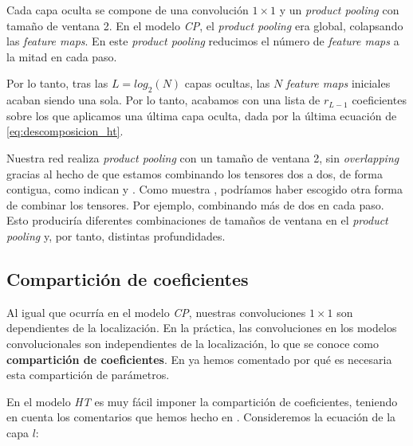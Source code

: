 Cada capa oculta se compone de una convolución $1 \times 1$ y un \textit{product pooling} con tamaño de ventana 2. En el modelo \textit{CP}, el \textit{product pooling} era global, colapsando las \textit{feature maps}. En este \textit{product pooling} reducimos el número de \textit{feature maps} a la mitad en cada paso.

Por lo tanto, tras las $L = log_2(N)$ capas ocultas, las $N$ \textit{feature maps} iniciales acaban siendo una sola. Por lo tanto, acabamos con una lista de $r_{L - 1}$ coeficientes sobre los que aplicamos una última capa oculta, dada por la última ecuación de \eqref{eq:descomposicion_ht}.

Nuestra red realiza \textit{product pooling} con un tamaño de ventana 2, sin \textit{overlapping} gracias al hecho de que estamos combinando los tensores dos a dos, de forma contigua, como indican  y . Como muestra \cite{matematicas:descomposicion_ht}, podríamos haber escogido otra forma de combinar los tensores. Por ejemplo, combinando más de dos en cada paso. Esto produciría diferentes combinaciones de tamaños de ventana en el \textit{product pooling} y, por tanto, distintas profundidades.





\subsection{Compartición de coeficientes}

Al igual que ocurría en el modelo \textit{CP}, nuestras convoluciones $1 \times 1$ son dependientes de la localización. En la práctica, las convoluciones en los modelos convolucionales son independientes de la localización, lo que se conoce como \textbf{compartición de coeficientes}. En  ya hemos comentado por qué es necesaria esta compartición de parámetros.

En el modelo \textit{HT} es muy fácil imponer la compartición de coeficientes, teniendo en cuenta los comentarios que hemos hecho en . Consideremos la ecuación de la capa $l$:

